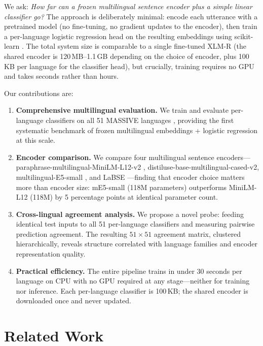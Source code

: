 \documentclass[11pt]{article}
\begin{document}
We ask: \textit{How far can a frozen multilingual sentence encoder plus a simple linear classifier go?} The approach is deliberately minimal: encode each utterance with a pretrained model (no fine-tuning, no gradient updates to the encoder), then train a per-language logistic regression head on the resulting embeddings using scikit-learn \citep{pedregosa2011sklearn}. The total system size is comparable to a single fine-tuned XLM-R (the shared encoder is 120\,MB--1.1\,GB depending on the choice of encoder, plus 100\,KB per language for the classifier head), but crucially, training requires no GPU and takes seconds rather than hours.

Our contributions are:

\begin{enumerate}
\item \textbf{Comprehensive multilingual evaluation.} We train and evaluate per-language classifiers on all 51 MASSIVE languages \citep{fitzgerald2023massive}, providing the first systematic benchmark of frozen multilingual embeddings + logistic regression at this scale.

\item \textbf{Encoder comparison.} We compare four multilingual sentence encoders---paraphrase-multilingual-MiniLM-L12-v2 \citep{wang2020minilm, reimers2019sentencebert}, distiluse-base-multilingual-cased-v2, multilingual-E5-small \citep{wang2024e5}, and LaBSE \citep{feng2022labse}---finding that encoder choice matters more than encoder size: mE5-small (118M parameters) outperforms MiniLM-L12 (118M) by 5 percentage points at identical parameter count.

\item \textbf{Cross-lingual agreement analysis.} We propose a novel probe: feeding identical test inputs to all 51 per-language classifiers and measuring pairwise prediction agreement. The resulting $51 \times 51$ agreement matrix, clustered hierarchically, reveals structure correlated with language families and encoder representation quality.

\item \textbf{Practical efficiency.} The entire pipeline trains in under 30 seconds per language on CPU with no GPU required at any stage---neither for training nor inference. Each per-language classifier is 100\,KB; the shared encoder is downloaded once and never updated.
\end{enumerate}


\section{Related Work}
\end{document}
